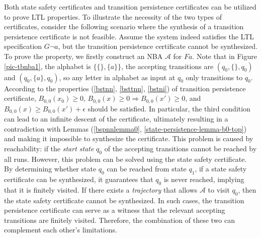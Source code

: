 Both state safety certificates and transition persistence certificates can be utilized to prove LTL properties. To illustrate the necessity of the two types of certificates, consider the following scenario where the synthesis of a transition persistence certificate is not feasible. Assume the system indeed satisfies the LTL specification $G \lnot a$, but the transition persistence certificate cannot be synthesized. To prove the property, we firstly construct an NBA $\mathcal{A}$ for $F a$. Note that in Figure \ref{pic-tbnba1}, the alphabet is $\{ \{\},\{a\}\}$, the accepting transitions are $(q_0, \{\}, q_0)$ and $(q_0, \{a\}, q_0)$, so any letter in alphabet as input at $q_0$ only transitions to $q_0$. According to the properties (\ref{bstnn}, \ref{bsttnn}, \ref{bstni}) of transition persistence certificate, $B_{0,0}(x_0) \geq 0$, $B_{0,0}(x) \geq 0 \Rightarrow B_{0,0}(x') \geq 0$, and $B_{0,0}(x) \geq B_{0,0}(x') + \epsilon$ should be satisfied. In particular, the third condition can lead to an infinite descent of the certificate, ultimately resulting in a contradiction with Lemmas (\ref{bspnnlemma0}, \ref{state-persistence-lemma-b0-top}) and making it impossible to synthesize the certificate. This problem is caused by reachability: if the \emph{start state} $q_0$ of the accepting transitions cannot be reached by all runs. However, this problem can be solved using the state safety certificate. By determining whether state $q_0$ can be reached from state $q_1$, if a state safety certificate can be synthesized, it guarantees that $q_0$ is never reached, implying that it is finitely visited. If there exists a \emph{trajectory} that allows $\mathcal{A}$ to visit $q_0$, then the state safety certificate cannot be synthesized. In such cases, the transition persistence certificate can serve as a witness that the relevant accepting transitions are finitely visited. Therefore, the combination of these two can complement each other's limitations.
